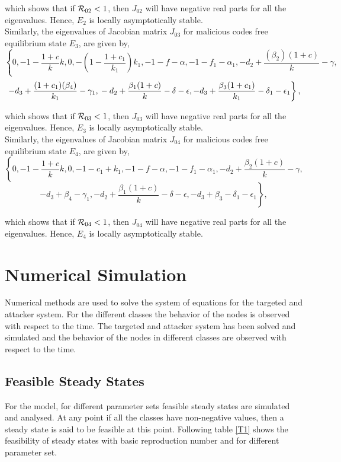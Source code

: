 \noindent which shows that if ${{\cal R}}_{02} < 1$, then $J_{02}$ will have negative real parts for all the eigenvalues. Hence, $E_2$ is locally asymptotically stable.\\
Similarly, the eigenvalues of Jacobian matrix $J_{03}$ for malicious codes free equilibrium state $E_3$, are given by,
\[
\left\{0,-{1-\frac{1+c}{k}} k,0,-(1-\frac{1+c_{1}}{k_{1}}) k_{1}, -1-f-\alpha,-1-f_{1}-\alpha_{1},-d_{2}+\frac{(\beta_{2})(1+c)}{k}-\gamma,
  \right. \]
\[ \left. -d_{3}+\frac{(1+c_{1})(\beta_{4})}{k_{1}}-\gamma_{1},\\
-d_{2}+\frac{\beta_{1}(1+c)}{k}-\delta-\epsilon,-d_{3}+\frac{\beta_{3}(1+c_{1})}{k_{1}}-\delta_{1}-\epsilon_{1}\right\}, \]

\noindent which shows that if ${{\cal R}}_{03} < 1$, then $J_{03}$ will have negative real parts for all the eigenvalues. Hence, $E_3$ is locally asymptotically stable.\\
Similarly, the eigenvalues of Jacobian matrix $J_{04}$ for malicious codes free equilibrium state $E_4$, are given by,
\[
\left\{0,-{1-\frac{1+c}{k}} k,0,-1-c_{1}+k_{1}, -1-f-\alpha,-1-f_{1}-\alpha_{1},-d_{2}+\frac{\beta_{2}(1+c)}{k}-\gamma,
  \right. \]
\[ \left. -d_{3}+\beta_{4}-\gamma_{1},
-d_{2}+\frac{\beta_{1}(1+c)}{k}-\delta-\epsilon,-d_{3}+\beta_{3}-\delta_{1}-\epsilon_{1}\right\}, \]

\noindent which shows that if ${{\cal R}}_{04} < 1$, then $J_{04}$ will have negative real parts for all the eigenvalues. Hence, $E_4$ is locally asymptotically stable.\\

\section{Numerical Simulation}
Numerical methods are used to solve the system of equations for the targeted and attacker system. For the different classes the behavior of the nodes is observed with respect to the time.
The targeted and attacker system has been solved and simulated and the behavior of the nodes in different classes are observed with respect to the time.
\subsection{Feasible Steady States}
For the model, for different parameter sets feasible steady states are simulated and analysed. At any point if all the classes have non-negative values, then a steady state is said to be feasible at this point. Following table \ref{T1} shows the feasibility of steady states with basic reproduction number and for different parameter set.

